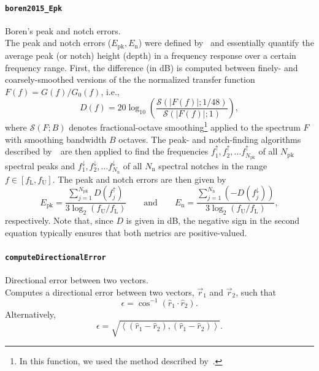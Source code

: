 \documentclass[11pt, oneside]{article}
\newcommand{\function}[1]{\paragraph*{\texttt{#1}}}
\begin{document}
\function{boren2015\_Epk} Boren's peak and notch errors. \\
The peak and notch errors ($E_{\text{pk}}, E_\text{n}$) were defined by~\citet{Boren2015}
and essentially quantify the average peak (or notch) height (depth) in a frequency response over a certain frequency range.
First, the difference (in dB) is computed between finely- and coarsely-smoothed versions of the the normalized transfer function $F(f) = G(f)/G_0(f)$, i.e.,
\begin{equation}
D(f) = 20 \log_{10} \left( \frac{ \mathcal{S}\left( |F(f)|; 1/48 \right) }{ \mathcal{S}\left( |F(f)|; 1 \right) } \right),
\end{equation}
where $\mathcal{S}(F; B)$ denotes fractional-octave smoothing\footnote{In this function, we used the method described by~\citet{Tylka2017}.} applied to the spectrum $F$ with smoothing bandwidth $B$ octaves.
The peak- and notch-finding algorithms described by~\citeauthor{Boren2015}~are then applied to find the frequencies $f_1^\uparrow, f_2^\uparrow, \dots f_{N_\text{pk}}^\uparrow$ of all $N_\text{pk}$ spectral peaks and $f_1^\downarrow, f_2^\downarrow, \dots f_{N_\text{n}}^\downarrow$  of all $N_\text{n}$ spectral notches in the range $f \in [f_\text{L}, f_\text{U}]$.
The peak and notch errors are then given by~\citep[Eq.~(1)]{Boren2015}
\begin{equation}
E_\text{pk} = \frac{\sum_{j = 1}^{N_\text{pk}} D(f_j^\uparrow)}{3 \log_2 (f_\text{U}/f_\text{L})}
\quad\quad\text{and}\quad\quad
E_\text{n} = \frac{\sum_{j = 1}^{N_\text{n}} (-D(f_j^\downarrow))}{3 \log_2 (f_\text{U}/f_\text{L})},
\end{equation}
respectively. Note that, since $D$ is given in dB, the negative sign in the second equation typically ensures that both metrics are positive-valued.

\function{computeDirectionalError} Directional error between two vectors. \\
Computes a directional error between two vectors, $\vec{r}_1$ and $\vec{r}_2$, such that
\begin{equation}
\epsilon = \cos^{-1} \left( \hat{r}_1 \cdot \hat{r}_2 \right).
\end{equation}
Alternatively,
\begin{equation}
\epsilon = \sqrt{ \left\langle \left( \hat{r}_1 - \hat{r}_2 \right), \left( \hat{r}_1 - \hat{r}_2 \right) \right\rangle }.
\end{equation}
\end{document}
